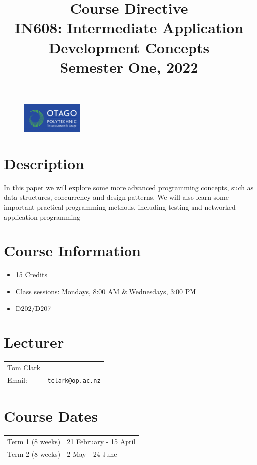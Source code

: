 \documentclass{article}
\begin{document}
\begin{figure}
\includegraphics[width=30mm]{oplogo.png}
\end{figure}

\title{Course Directive\\IN608: Intermediate Application Development Concepts \\Semester One, 2022}
\date{}
\maketitle

\section*{Description}
In this paper we will explore some more advanced programming concepts, such as data structures, concurrency and 
design patterns.  We will also learn some important practical programming methods, including testing and networked
application programming



\section*{Course Information}
\begin{itemize}
  \item 15 Credits
  \item Class sessions: Mondays, 8:00 AM \& Wednesdays, 3:00 PM
  \item D202/D207
\end{itemize}

\section*{Lecturer}
\begin{tabular}{lr}

  Tom Clark &    \\
     Email: & \texttt{tclark@op.ac.nz} \\
        
\end{tabular}

\section*{Course Dates}
\begin{tabular}{ll}
Term 1 (8 weeks) & 21 February - 15 April\\
Term 2 (8 weeks) &  2 May - 24 June\\
\end{tabular}
\end{document}
